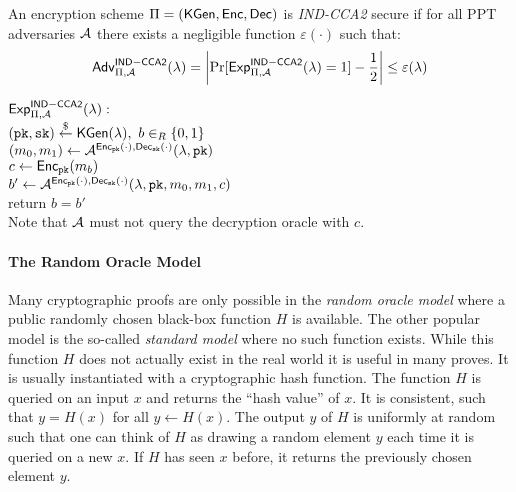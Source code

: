 \begin{definition}\label{def:indcca2}
An encryption scheme $\Pi=(\mathsf{KGen},\mathsf{Enc},\mathsf{Dec})$ is \emph{IND-CCA2} secure if for all \ac{PPT} adversaries $\mathcal{A}$ there exists a negligible function $\varepsilon(\cdot)$ such that:
\[\mathsf{Adv}_{\Pi,\mathcal{A}}^{\mathsf{IND-CCA2}}(\lambda)=\left|\Pr[\mathsf{Exp}^{\mathsf{IND-CCA2}}_{\Pi,\mathcal{A}}(\lambda)=1]-\frac12\right|\leq\varepsilon(\lambda)\]

\noindent
$\mathsf{Exp}^{\mathsf{IND-CCA2}}_{\Pi,\mathcal{A}}(\lambda):$\\
\hspace*{2em}$(\mathtt{pk},\mathtt{sk})\stackrel{\$}{\gets}\mathsf{KGen}(\lambda),~b\in_R\{0,1\}$\\
\hspace*{2em}$(m_0,m_1)\gets\mathcal{A}^{\mathsf{Enc}_\mathtt{pk}(\cdot),\mathsf{Dec}_\mathtt{sk}(\cdot)}(\lambda,\mathtt{pk})$\\
\hspace*{2em}$c\gets\mathsf{Enc}_\mathtt{pk}(m_b)$\\
\hspace*{2em}$b'\gets\mathcal{A}^{\mathsf{Enc}_\mathtt{pk}(\cdot),\mathsf{Dec}_\mathtt{sk}(\cdot)}(\lambda,\mathtt{pk},m_0,m_1,c)$\\
\hspace*{2em}return $b=b'$\\
Note that $\mathcal{A}$ must not query the decryption oracle with $c$.
\eod
\end{definition}

\paragraph{The Random Oracle Model}
Many cryptographic proofs are only possible in the \emph{random oracle model} where a public randomly chosen black-box function $H$ is available.
The other popular model is the so-called \emph{standard model} where no such function exists.
While this function $H$ does not actually exist in the real world it is useful in many proves.
It is usually instantiated with a cryptographic hash function.
The function $H$ is queried on an input $x$ and returns the ``hash value'' of $x$.
It is consistent, such that $y=H(x)$ for all $y\gets H(x)$.
The output $y$ of $H$ is uniformly at random such that one can think of $H$ as drawing a random element $y$ each time it is queried on a new $x$.
If $H$ has seen $x$ before, it returns the previously chosen element $y$.

